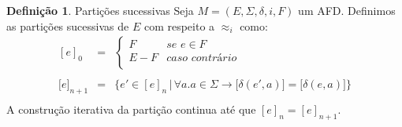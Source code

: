 \documentclass[a4paper]{article}
\theoremstyle{definition}
\newtheorem{Definition}{Definição}
\begin{document}
  \begin{Definition}{Partições sucessivas}
    Seja $M = (E,\Sigma,\delta, i, F)$ um  AFD. Definimos as partições
    sucessivas de $E$ com respeito a $\approx_i$ como:
    \[
      \begin{array}{lcl}
        [e]_0 & = & \left\{
                    \begin{array}{ll}
                      F & \textit{se }e\in F \\
                      E - F & \textit{caso contrário} \\
                    \end{array}
        \right. \\ \\
        \lbrack e\rbrack_{n+1} & = & \{e' \in [e]_n\,|\,\forall a. a \in \Sigma \to
                        \lbrack\delta(e',a)\rbrack = \lbrack\delta(e,a)\rbrack\}\\
      \end{array}
    \]
    A construção iterativa da partição continua até que $[e]_n = [e]_{n + 1}$.
  \end{Definition}
\end{document}
